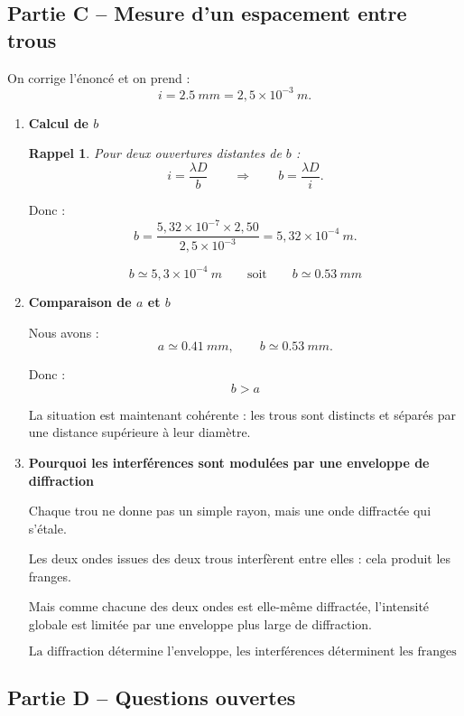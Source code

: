 \documentclass[11pt,a4paper]{article}
\newtheorem*{rappel}{Rappel}
\begin{document}
\subsection*{Partie C -- Mesure d’un espacement entre trous}

On corrige l’énoncé et on prend :
\[
i=\SI{2,5}{mm}=2{,}5\times 10^{-3}\ \si{m}.
\]

\begin{enumerate}[label=\textbf{1.\arabic*}, resume, leftmargin=1.6em]

\item \textbf{Calcul de \(b\)}

\begin{rappel}
Pour deux ouvertures distantes de \(b\) :
\[
i=\frac{\lambda D}{b}
\qquad\Longrightarrow\qquad
b=\frac{\lambda D}{i}.
\]
\end{rappel}

Donc :
\[
b=\frac{5{,}32\times 10^{-7}\times 2{,}50}{2{,}5\times 10^{-3}}
=5{,}32\times 10^{-4}\ \si{m}.
\]

\[
\boxed{b \simeq 5{,}3\times 10^{-4}\ \si{m}}
\qquad\text{soit}\qquad
\boxed{b \simeq \SI{0,53}{mm}}
\]

\item \textbf{Comparaison de \(a\) et \(b\)}

Nous avons :
\[
a \simeq \SI{0,41}{mm},
\qquad
b \simeq \SI{0,53}{mm}.
\]

Donc :
\[
\boxed{b>a}
\]

La situation est maintenant cohérente : les trous sont distincts et séparés par une distance supérieure à leur diamètre.

\item \textbf{Pourquoi les interférences sont modulées par une enveloppe de diffraction}

Chaque trou ne donne pas un simple rayon, mais une onde diffractée qui s’étale.

Les deux ondes issues des deux trous interfèrent entre elles : cela produit les franges.

Mais comme chacune des deux ondes est elle-même diffractée, l’intensité globale est limitée par une enveloppe plus large de diffraction.

\[
\boxed{\text{La diffraction détermine l'enveloppe, les interférences déterminent les franges fines.}}
\]

\end{enumerate}

\subsection*{Partie D -- Questions ouvertes}
\end{document}
